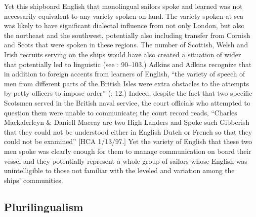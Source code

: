 Yet this shipboard English that monolingual sailors spoke and learned was not necessarily equivalent to any variety spoken on land. The variety spoken at sea was likely to have significant dialectal influence from not only London, but also the northeast and the southwest, potentially also including transfer from Cornish and Scots that were spoken in these regions. The number of Scottish, Welsh and Irish recruits serving on the ships would have also created a situation of wider  that potentially led to linguistic  (see \citealt{Trudgill1986}: 90--103.) Adkins and Adkins recognize that in addition to foreign accents from learners of English, “the variety of speech of men from different parts of the British Isles were extra obstacles to the attempts by petty officers to impose order” (\citealt{AdkinsAdkins2008}: 12.) Indeed, despite the fact that two specific Scotsmen served in the British naval service, the court officials who attempted to question them were unable to communicate; the court record reads, “Charles Mackalerleyn \& Daniell Maccay are two High Landers and Spoke such Gibberish that they could not be understood either in English Dutch or French so that they could not be examined” [HCA 1/13/97.] Yet the variety of English that these two men spoke was clearly enough for them to manage communication on board their vessel and they potentially represent a whole group of sailors whose English was unintelligible to those not familiar with the leveled  and variation among the ships’ communities. 

\subsection{{Plurilingualism}}\label{sec:3.10.2}

